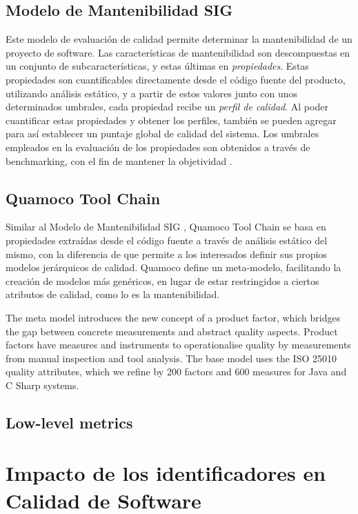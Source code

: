 \subsection{Modelo de Mantenibilidad SIG}

Este modelo de evaluación de calidad \cite{Heitlager2007} permite determinar la mantenibilidad
de un proyecto de software.
Las características de mantenibilidad son descompuestas en un conjunto de subcaracterísticas,
y estas últimas en \textit{propiedades}.
Estas propiedades son cuantificables directamente desde el código fuente del producto, utilizando
análisis estático, y a partir de estos valores junto con unos determinados umbrales,
cada propiedad recibe un \textit{perfil de calidad}.
Al poder cuantificar estas propiedades y obtener los perfiles, también se pueden agregar
para así establecer un puntaje global de calidad del sistema.
Los umbrales empleados en la evaluación de los propiedades son obtenidos a través de
benchmarking, con el fin de mantener la objetividad \cite{Alves2010}.

\subsection{Quamoco Tool Chain}

Similar al Modelo de Mantenibilidad SIG \cite{Heitlager2007}, Quamoco Tool Chain \cite{Wagner2012}
se basa en propiedades extraídas desde el código fuente a través de análisis estático del mismo,
con la diferencia de que permite a los interesados definir sus propios modelos jerárquicos
de calidad.
Quamoco define un meta-modelo, facilitando la creación de modelos más genéricos, en lugar de
estar restringidos a ciertos atributos de calidad, como lo es la mantenibilidad.

The meta model introduces the new concept of a product factor, which bridges the gap between
concrete measurements and abstract quality aspects.
Product factors have measures and instruments to operationalise quality by measurements from
manual inspection and tool analysis.
The base model uses the ISO 25010 quality attributes, which we refine by 200 factors and 600
measures for Java and C Sharp systems.

\subsection{Low-level metrics}

\section{Impacto de los identificadores en Calidad de Software}

